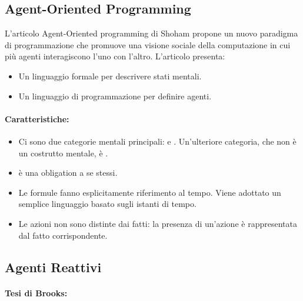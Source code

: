 \subsection{Agent-Oriented Programming}

L'articolo Agent-Oriented programming di Shoham propone un nuovo paradigma di programmazione che promuove una visione sociale della computazione in cui più agenti interagiscono l'uno con l'altro. L'articolo presenta:
\begin{itemize}
  \item Un linguaggio formale per descrivere stati mentali. 
  \item Un linguaggio di programmazione per definire agenti. 
\end{itemize}

\paragraph{Caratteristiche:}

\begin{itemize}
  \item Ci sono due categorie mentali principali:  e . Un'ulteriore categoria, che non è un costrutto mentale, è . 
  \item {} è una obligation a se stessi. 
  \item Le formule fanno esplicitamente riferimento al tempo. Viene adottato un semplice linguaggio basato sugli istanti di tempo. 
  \item Le azioni non sono distinte dai fatti: la presenza di un'azione è rappresentata dal fatto corrispondente.
\end{itemize}


\subsection{Agenti Reattivi}


\paragraph{Tesi di Brooks:}

